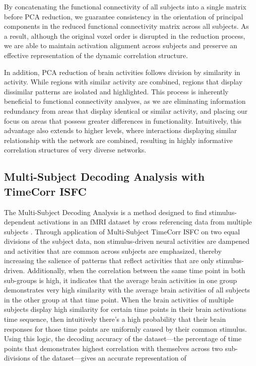 \documentclass[11pt]{article}
\begin{document}
By concatenating the functional connectivity of all subjects into a single matrix before PCA reduction, we guarantee consistency in the orientation of principal components in the reduced functional connectivity matrix across all subjects. As a result, although the original voxel order is disrupted in the reduction process, we are able to maintain activation alignment across subjects and preserve an effective representation of the dynamic correlation structure.

In addition, PCA reduction of brain activities follows division by similarity in activity. While regions with similar activity are combined, regions that display dissimilar patterns are isolated and highlighted. This process is inherently beneficial to functional connectivity analyses, as we are eliminating information redundancy from areas that display identical or similar activity, and placing our focus on areas that possess greater differences in functionality. Intuitively, this advantage also extends to higher levels, where interactions displaying similar relationship with the network are combined, resulting in highly informative correlation structures of very diverse networks.

\subsection{Multi-Subject Decoding Analysis with TimeCorr ISFC}
The Multi-Subject Decoding Analysis is a method designed to find stimulus-dependent activations in an fMRI dataset by cross referencing data from multiple subjects \citep{jeremy2017}. Through application of Multi-Subject TimeCorr ISFC on two equal divisions of the subject data, non stimulus-driven neural activities are dampened and activities that are common across subjects are emphasized, thereby increasing the salience of patterns that reflect activities that are only stimulus-driven. Additionally, when the correlation between the same time point in both sub-groups is high, it indicates that the average brain activities in one group demonstrates very high similarity with the average brain activities of all subjects in the other group at that time point. When the brain activities of multiple subjects display high similarity for certain time points in their brain activations time sequence, then intuitively there's a high probability that their brain responses for those time points are uniformly caused by their common stimulus. Using this logic, the decoding accuracy of the dataset---the percentage of time points that demonstrates highest correlation with themselves across two sub-divisions of the dataset---gives an accurate representation of
\end{document}
